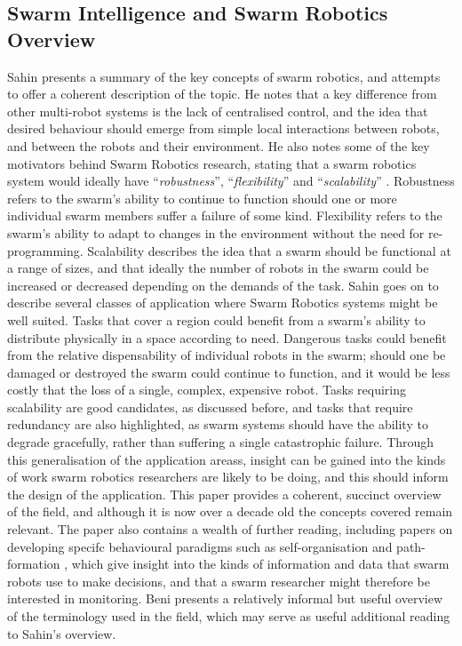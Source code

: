 \documentclass[hidelinks,10pt]{article}
\begin{document}
\subsection{Swarm Intelligence and Swarm Robotics Overview} \label{GeneralSR}
Sahin \cite{InspirationToApplication} presents a summary of the key concepts of swarm robotics, and attempts to offer a coherent description of the topic. He notes that a key difference from other multi-robot systems is the lack of centralised control, and the idea that desired behaviour should emerge from simple local interactions between robots, and between the robots and their environment. He also notes some of the key motivators behind Swarm Robotics research, stating that a swarm robotics system would ideally have ``\textit{robustness}'', ``\textit{flexibility}'' and ``\textit{scalability}'' \cite{InspirationToApplication}. Robustness refers to the swarm's ability to continue to function should one or more individual swarm members suffer a failure of some kind. Flexibility refers to the swarm's ability to adapt to changes in the environment without the need for re-programming. Scalability describes the idea that a swarm should be functional at a range of sizes, and that ideally the number of robots in the swarm could be increased or decreased depending on the demands of the task. Sahin \cite{InspirationToApplication} goes on to describe several classes of application where Swarm Robotics systems might be well suited. Tasks that cover a region could benefit from a swarm's ability to distribute physically in a space according to need. Dangerous tasks could benefit from the relative dispensability of individual robots in the swarm; should one be damaged or destroyed the swarm could continue to function, and it would be less costly that the loss of a single, complex, expensive robot. Tasks requiring scalability are good candidates, as discussed before, and tasks that require redundancy are also highlighted, as swarm systems should have the ability to degrade gracefully, rather than suffering a single catastrophic failure. Through this generalisation of the application areass, insight can be gained into the kinds of work swarm robotics researchers are likely to be doing, and this should inform the design of the application. This paper \cite{InspirationToApplication} provides a coherent, succinct overview of the field, and although it is now over a decade old the concepts covered remain relevant. The paper also contains a wealth of further reading, including papers on developing specifc behavioural paradigms such as self-organisation \cite{SelfOrganizing} and path-formation \cite{PathFormation}, which give insight into the kinds of information and data that swarm robots use to make decisions, and that a swarm researcher might therefore be interested in monitoring. Beni \cite{FromSIToSR} presents a relatively informal but useful overview of the terminology used in the field, which may serve as useful additional reading to Sahin's overview.
\end{document}
